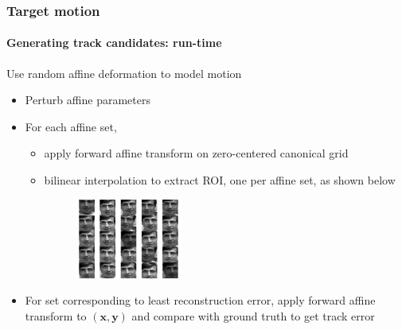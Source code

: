 \begin{frame}
\frametitle{Target motion}
\framesubtitle{Generating track candidates: run-time}
\mypagenum{}
Use random affine deformation to model motion
\begin{itemize}
\item Perturb affine parameters
\item For each affine set, 
\begin{itemize}
\item apply forward affine transform on zero-centered canonical grid 
\item bilinear interpolation to extract ROI, one per affine set, as shown below
\begin{figure}[t]
\centering
\includegraphics[width=0.35\textwidth]{figs/affineCandidates.pdf}
\label{Fig:affine_candidates}
\end{figure}
\end{itemize}
\item For set corresponding to least reconstruction error, apply forward affine transform to $(\mathbf{x, y})$ and compare with ground truth to get track error
\end{itemize}
\end{frame}



